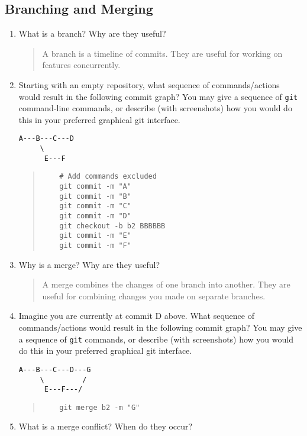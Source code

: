 \documentclass[10pt,twocolumn]{article}
\begin{document}
\subsection{Branching and Merging}

\begin{enumerate}
\item What is a branch? Why are they useful?
    \begin{quote}
        A branch is a timeline of commits.
        They are useful for working on features concurrently.
    \end{quote}
\item Starting with an empty repository, what sequence of commands/actions would result in the following commit graph? You may give a sequence of \texttt{git} command-line commands, or describe (with screenshots) how you would do this in your preferred graphical git interface.
\begin{verbatim}
A---B---C---D
     \
      E---F
\end{verbatim}
\begin{quote}
    \begin{verbatim}
    # Add commands excluded
    git commit -m "A"
    git commit -m "B"
    git commit -m "C"
    git commit -m "D"
    git checkout -b b2 BBBBBB
    git commit -m "E"
    git commit -m "F"
    \end{verbatim}
\end{quote}
\item Why is a merge? Why are they useful?
\begin{quote}
    A merge combines the changes of one branch into another.
    They are useful for combining changes you made on separate branches.
\end{quote}
\item Imagine you are currently at commit D above. What sequence of commands/actions would result in the following commit graph? You may give a sequence of \texttt{git} commands, or describe (with screenshots) how you would do this in your preferred graphical git interface.
\begin{verbatim}
A---B---C---D---G
     \         /
      E---F---/
\end{verbatim}
\begin{quote}
    \begin{verbatim}
    git merge b2 -m "G"
    \end{verbatim}
\end{quote}
\item What is a merge conflict? When do they occur?

\end{enumerate}
\end{document}
